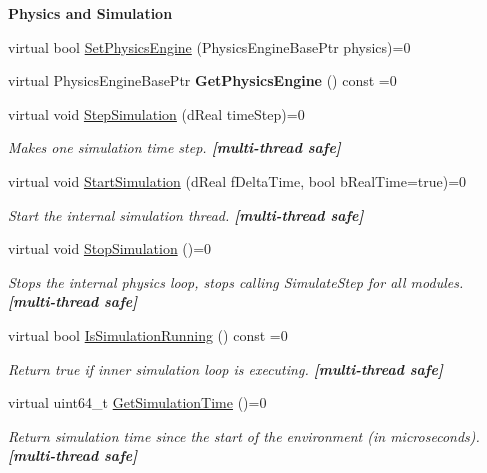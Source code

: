\begin{Indent}{\bf Physics and Simulation}\par
{\em \label{_amgrp989eadcf88740d0033db2c36bbbdd040}
 }\begin{DoxyCompactItemize}
\item 
virtual bool \hyperlink{classOpenRAVE_1_1EnvironmentBase_a4b682d62526e5840d8fdc25343ee563c}{SetPhysicsEngine} (PhysicsEngineBasePtr physics)=0
\item 
\hypertarget{classOpenRAVE_1_1EnvironmentBase_a35c7646815b726666dde070c3bba6da0}{
virtual PhysicsEngineBasePtr {\bfseries GetPhysicsEngine} () const =0}
\label{classOpenRAVE_1_1EnvironmentBase_a35c7646815b726666dde070c3bba6da0}

\item 
virtual void \hyperlink{classOpenRAVE_1_1EnvironmentBase_aebf2566ccd76644b0040f01e70d2c189}{StepSimulation} (dReal timeStep)=0
\begin{DoxyCompactList}\small\item\em Makes one simulation time step. {\bfseries \mbox{[}multi-\/thread safe\mbox{]}} \item\end{DoxyCompactList}\item 
virtual void \hyperlink{classOpenRAVE_1_1EnvironmentBase_a4e00e5f00d51ae10aa6bc017f827fea7}{StartSimulation} (dReal fDeltaTime, bool bRealTime=true)=0
\begin{DoxyCompactList}\small\item\em Start the internal simulation thread. {\bfseries \mbox{[}multi-\/thread safe\mbox{]}} \item\end{DoxyCompactList}\item 
virtual void \hyperlink{classOpenRAVE_1_1EnvironmentBase_a2fcaf7d48ec497898ad0ef0c5a3eb89b}{StopSimulation} ()=0
\begin{DoxyCompactList}\small\item\em Stops the internal physics loop, stops calling SimulateStep for all modules. {\bfseries \mbox{[}multi-\/thread safe\mbox{]}} \item\end{DoxyCompactList}\item 
virtual bool \hyperlink{classOpenRAVE_1_1EnvironmentBase_a0267abbf0177d8ee2570c6a57b59cc39}{IsSimulationRunning} () const =0
\begin{DoxyCompactList}\small\item\em Return true if inner simulation loop is executing. {\bfseries \mbox{[}multi-\/thread safe\mbox{]}} \item\end{DoxyCompactList}\item 
virtual uint64\_\-t \hyperlink{classOpenRAVE_1_1EnvironmentBase_aa9b102e35855f8dfd216e282e179fe3c}{GetSimulationTime} ()=0
\begin{DoxyCompactList}\small\item\em Return simulation time since the start of the environment (in microseconds). {\bfseries \mbox{[}multi-\/thread safe\mbox{]}} \item\end{DoxyCompactList}\end{DoxyCompactItemize}
\end{Indent}
